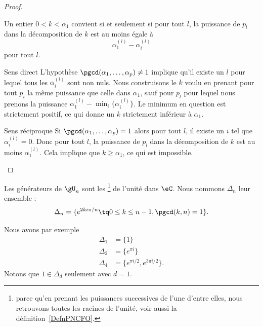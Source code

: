 \begin{proof}
\begin{subproof}
        Un entier \( 0<k<\alpha_1\) convient si et seulement si pour tout \( l\), la puissance de \( p_l\) dans la décomposition de \( k\) est au moins égale à
        \begin{equation}
            \alpha_1^{(l)}-\alpha_i^{(l)}
        \end{equation}
        pour tout \( l\).
    \item[Sens direct]
        L'hypothèse \( \pgcd(\alpha_1,\ldots, \alpha_p)\neq 1\) implique qu'il existe un \( l\) pour lequel tous les \( \alpha_i^{(l)}\) sont non nuls. Nous construisons le \( k\) voulu en prenant pour tout \( p_i\) la même puissance que celle dans \( \alpha_1\), sauf pour \( p_l\) pour lequel nous prenons la puissance \(  \alpha_1^{(l)}-\min_i\{   \alpha_i^{(l)} \} \). Le minimum en question est strictement positif, ce qui donne un \( k\) strictement inférieur à \( \alpha_1\).
    \item[Sens réciproque]
        Si \( \pgcd(\alpha_1,\ldots, \alpha_p)=1\) alors pour tout \( l\), il existe un \( i\) tel que \( \alpha_i^{(l)}=0\). Donc pour tout \( l\), la puissance de \( p_l\) dans la décomposition de \( k\) est au moins \( \alpha_1^{(l)}\). Cela implique que \( k\geq \alpha_1\), ce qui est impossible.
    \end{subproof}
\end{proof}

\begin{definition}\label{DefLYGTooFPOYGZ}
    Les générateurs de \( \gU_n\) sont les \footnote{parce qu'en prenant les puissances successives de l'une d'entre elles, nous retrouvons toutes les racines de l'unité, voir aussi la définition~\ref{DefnPNCFO}.} de l'unité dans \( \eC\). Nous nommons \( \Delta_n\) leur ensemble :
\begin{equation}
    \Delta_n=\{  e^{2ki\pi/n}\tq 0\leq k\leq n-1,\pgcd(k,n)=1 \}.
\end{equation}
\end{definition}
Nous avons par exemple
\begin{subequations}
    \begin{align}
        \Delta_1&=\{ 1 \}\\
        \Delta_2&=\{  e^{\pi i} \}\\
        \Delta_4&=\{  e^{\pi i/2}, e^{3\pi i/2} \}.
    \end{align}
\end{subequations}
Notons que \( 1\in \Delta_d\) seulement avec \( d=1\).

